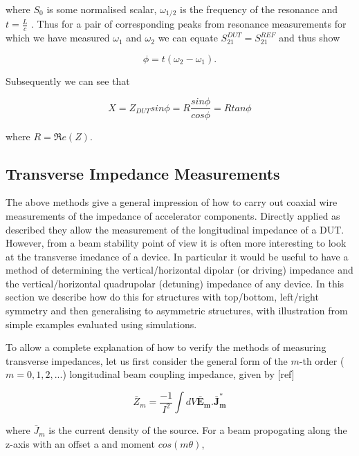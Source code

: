 where $S_{0}$ is some normalised scalar, $\omega_{1/2}$ is the frequency of the resonance and $t = \frac{L}{c}$ . Thus for a pair of corresponding peaks from resonance measurements for which we have measured $\omega_{1}$ and $\omega_{2}$ we can equate $S_{21}^{DUT} = S_{21}^{REF}$ and thus show

\begin{equation}
\phi = t \left( \omega_{2} - \omega_{1} \right).
\end{equation}

Subsequently we can see that

\begin{equation}
X = Z_{DUT} sin \phi = R \frac {sin \phi}{cos \phi} = R tan \phi
\end{equation}

where $R = \Re e(Z)$.

\subsection{Transverse Impedance Measurements}

The above methods give a general impression of how to carry out coaxial wire measurements of the impedance of accelerator components. Directly applied as described they allow the measurement of the longitudinal impedance of a DUT. However, from a beam stability point of view it is often more interesting to look at the transverse imedance of a device. In particular it would be useful to have a method of determining the vertical/horizontal dipolar (or driving) impedance and the vertical/horizontal quadrupolar (detuning) impedance of any device. In this section we describe how do this for structures with top/bottom, left/right symmetry and then generalising to asymmetric structures, with illustration from simple examples evaluated using simulations.

To allow a complete explanation of how to verify the methods of measuring transverse impedances, let us first consider the general form of the $m$-th order ($m = 0, 1, 2,...$) longitudinal beam coupling impedance, given by [ref]

\begin{equation}
\bar{Z}_{m} = \frac{-1}{I^{2}} \int dV \mathbf{\bar{E}_{m}. \bar{J}_{m}^{*}}
\end{equation}

where $\bar{J}_{m}$ is the current density of the source. For a beam propogating along the z-axis with an offset a and moment $cos \left( m \theta \right)$,

